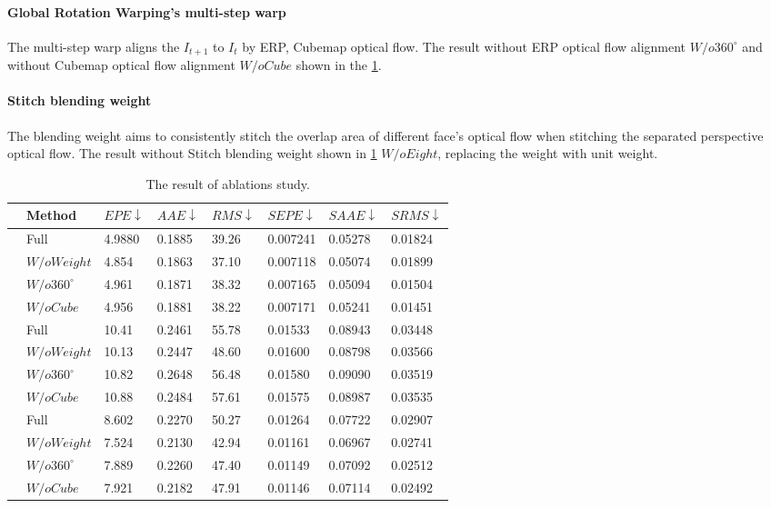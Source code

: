 \paragraph{Global Rotation Warping's multi-step warp}
The multi-step warp aligns the $I_{t+1}$ to $I_t$ by ERP, Cubemap optical flow. The result without ERP optical flow alignment $W/o360^\circ$ and without Cubemap optical flow alignment $W/oCube$ shown in the \cref{fig:exp:ablations}.

\paragraph{Stitch blending weight}
The blending weight aims to consistently stitch the overlap area of different face's optical flow when stitching the separated perspective optical flow.
The result without Stitch blending weight shown in \cref{fig:exp:ablations} $W/oEight$, replacing the weight with unit weight.


\begin{table}[h!]
	\centering
	\caption{\label{fig:exp:ablations}%
		The result of ablations study.}
	\begin{tabular}{p{0.2cm}p{1.6cm}p{1.2cm}p{1.2cm}p{1.2cm}p{1.2cm}p{1.2cm}p{1.2cm}}
		\hline
		&  Method & ${EPE}\downarrow$ & $AAE\downarrow$ & $RMS\downarrow$ & $SEPE\downarrow$ & ${SAAE}\downarrow$ & ${SRMS}\downarrow$ \\
		\hline
		\multirow{3}{*}{\rotatebox[origin=c]{90}{Circle}}
		 & Full & 4.9880 & 0.1885  & 39.26 & 0.007241 & 0.05278 & 0.01824 \\ 
		& $W/oWeight$ &  4.854 &  0.1863  & 37.10   & 0.007118  &  0.05074 &  0.01899 \\
		& $W/o360^\circ$ & 4.961 & 0.1871 & 38.32  & 0.007165 & 0.05094  & 0.01504 \\ 
		& $W/oCube$  & 4.956 & 0.1881 &  38.22 &  0.007171 & 0.05241  & 0.01451 \\ 
		\hline
		\multirow{3}{*}{\rotatebox[origin=c]{90}{Line}} 
		& Full & 10.41 & 0.2461  & 55.78 & 0.01533 & 0.08943 & 0.03448 \\
		&  $W/oWeight$ &  10.13 & 0.2447 &  48.60 & 0.01600  & 0.08798  & 0.03566 \\ 
		& $W/o360^\circ$ & 10.82 & 0.2648 & 56.48 & 0.01580   & 0.09090  & 0.03519 \\ 
		& $W/oCube$  & 10.88 & 0.2484 & 57.61  & 0.01575  & 0.08987  & 0.03535  \\ 
		\hline
		\multirow{4}{*}{\rotatebox[origin=c]{90}{All}}
		& Full & 8.602 & 0.2270  & 50.27 & 0.01264 & 0.07722 & 0.02907 \\
		& $W/oWeight$ & 7.524  & 0.2130   & 42.94   & 0.01161  & 0.06967  & 0.02741  \\
		& $W/o360^\circ$ & 7.889 & 0.2260 & 47.40 & 0.01149 & 0.07092  & 0.02512  \\
		& $W/oCube$  & 7.921 & 0.2182  & 47.91 & 0.01146 & 0.07114 & 0.02492 \\
		\hline
	\end{tabular}
\end{table}
